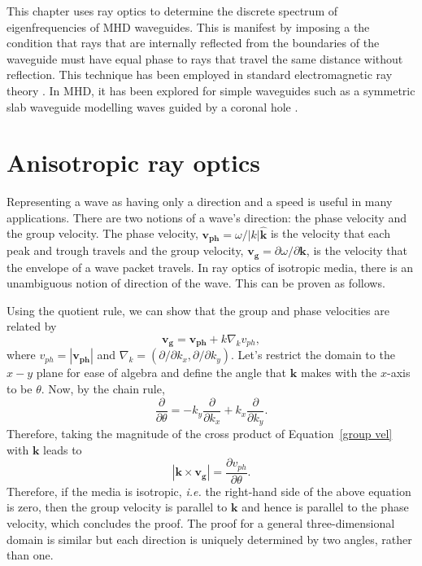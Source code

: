 \documentclass[12pt]{../style-files/ociamthesis}
\begin{document}
	This chapter uses ray optics to determine the discrete spectrum of eigenfrequencies of MHD waveguides. This is manifest by imposing a the condition that rays that are internally reflected from the boundaries of the waveguide must have equal phase to rays that travel the same distance without reflection. This technique has been employed in standard electromagnetic ray theory \citep{bor_etal99}. In MHD, it has been explored for simple waveguides such as a symmetric slab waveguide modelling waves guided by a coronal hole \citep{dav_85}.
	
	
	\section{Anisotropic ray optics}
	\label{sec: aniso ray}
		
	Representing a wave as having only a direction and a speed is useful in many applications. There are two notions of a wave's direction: the phase velocity and the group velocity. The phase velocity, $\mathbf{v_{ph}} = \omega / |k| \mathbf{\hat{k}}$ is the velocity that each peak and trough travels and the group velocity, $\mathbf{v_g} = \partial \omega / \partial \mathbf{k}$, is the velocity that the envelope of a wave packet travels. In ray optics of isotropic media, there is an unambiguous notion of direction of the wave. This can be proven as follows.
	
	Using the quotient rule, we can show that the group and phase velocities are related by
	\begin{equation}
	\mathbf{v_g} = \mathbf{v_{ph}} + k\nabla_k v_{ph}, \label{group vel}
	\end{equation}
	where $v_{ph} = |\mathbf{v_{ph}}|$ and $\nabla_k = (\partial/\partial k_x, \partial/\partial k_y)$. Let's restrict the domain to the $x-y$ plane for ease of algebra and define the angle that $\mathbf{k}$ makes with the $x$-axis to be $\theta$. Now, by the chain rule,
	\begin{equation}
	\frac{\partial}{\partial \theta} = -k_y \frac{\partial}{\partial k_x} + k_x \frac{\partial}{\partial k_y}.
	\end{equation}
	Therefore, taking the magnitude of the cross product of Equation~\eqref{group vel} with $\mathbf{k}$ leads to
	\begin{equation}
	|\mathbf{k} \times \mathbf{v_g}| = \frac{\partial v_{ph}}{\partial \theta}.
	\end{equation}
	Therefore, if the media is isotropic, \textit{i.e.} the right-hand side of the above equation is zero, then the group velocity is parallel to $\mathbf{k}$ and hence is parallel to the phase velocity, which concludes the proof. The proof for a general three-dimensional domain is similar but each direction is uniquely determined by two angles, rather than one.
	
\end{document}
